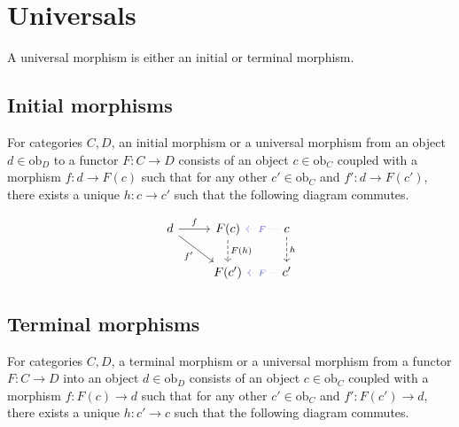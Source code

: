 \section{Universals}
A universal morphism is either an initial or terminal morphism.
\parencite{maclane:working_mathematician}

\subsection{Initial morphisms}
For categories $C,D$, an initial morphism or a universal morphism from an object
$d\in \mathrm{ob}_D$ to a functor $F : C \to D$ consists of an object
$c\in\mathrm{ob}_C$ coupled with a morphism $f: d \to F(c)$ such that for any
other $c'\in\mathrm{ob}_C$ and $f': d \to F(c')$, there exists a unique
$h:c\to c'$ such that the following diagram commutes.

\[\begin{tikzcd}
	d & {F(c)} & c \\
	& {F(c')} & {c'}
	\arrow["h", dashed, from=1-3, to=2-3]
	\arrow["{F(h)}", dashed, from=1-2, to=2-2]
	\arrow["{f'}"', from=1-1, to=2-2]
	\arrow["f", from=1-1, to=1-2]
	\arrow["F"{description}, color={rgb,255:red,92;green,92;blue,214}, dotted, from=1-3, to=1-2]
	\arrow["F"{description}, color={rgb,255:red,92;green,92;blue,214}, dotted, from=2-3, to=2-2]
\end{tikzcd}\]

\subsection{Terminal morphisms}
For categories $C,D$, a terminal morphism or a universal morphism from a functor
$F: C \to D$ into an object $d\in\mathrm{ob}_D$ consists of an object
$c\in\mathrm{ob}_C$ coupled with a morphism $f: F(c) \to d$ such that for any
other $c'\in\mathrm{ob}_C$ and $f': F(c') \to d$, there exists a unique
$h:c' \to c$ such that the following diagram commutes.

